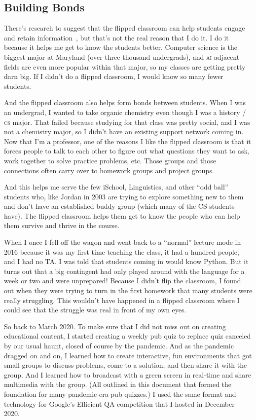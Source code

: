 \documentclass[11pt]{amsart}
\newcommand{\abr}[1]{\textsc{#1}}
\begin{document}
\subsection{Building Bonds}

There's research to suggest that the flipped classroom can help
students engage and retain information~\cite{Zuber-16}, but that's not
the real reason that I do it.
%
I do it because it helps me get to know the students better.  Computer
science is the biggest major at Maryland (over three thousand undergrads), and
\abr{ai}-adjacent fields are even more popular within that major, so my
classes are getting pretty darn big.
%
If I didn't do a flipped
classroom, I would know so many fewer students.

And the flipped classroom also helps form bonds between students.
%
When I was an undergrad, I wanted to take organic chemistry even
though I was a history / \abr{cs} major.
%
That failed because studying for
that class was pretty social, and I was not a chemistry major, so I
didn't have an existing support network coming in.
%
Now that I'm a
professor, one of the reasons I like the flipped classroom is that it
forces people to talk to each other to figure out what questions they
want to ask, work together to solve practice problems, etc.
%
Those
groups and those connections often carry over to homework groups and
project groups.

And this helps me serve the few iSchool, Linguistics, and other ``odd
ball'' students who, like Jordan in 2003 are trying to explore
something new to them and don't have an established buddy group (which
many of the CS students have).  The flipped classroom helps them get
to know the people who can help them survive and thrive in the course.

When I once I fell off the wagon and went back to a ``normal'' lecture
mode in 2016 because it was my first time teaching the class, it had a
hundred people, and I had no TA.  I was told that students coming in
would know Python.  But it turns out that a big contingent had only
played around with the language for a week or two and were unprepared!
Because I didn't flip the classroom, I found out when they were trying
to turn in the first homework that many students were really
struggling.  This wouldn't have happened in a flipped classroom where
I could see that the struggle was real in front of my own eyes.

So back to March 2020. To make sure that I did not miss out on
creating educational content, I started creating a weekly pub quiz to
replace quiz canceled by our usual haunt, closed of course by the
pandemic.  And as the pandemic dragged on and on, I learned how to
create interactive, fun environments that got small groups to discuss
problems, come to a solution, and then share it with the group.  And I
learned how to broadcast with a green screen in real-time and share
multimedia with the group.  (All outlined in this document that formed
the foundation for many pandemic-era pub quizzes.)  I used the same
format and technology for Google's Efficient QA competition that I
hosted in December 2020.
\end{document}

